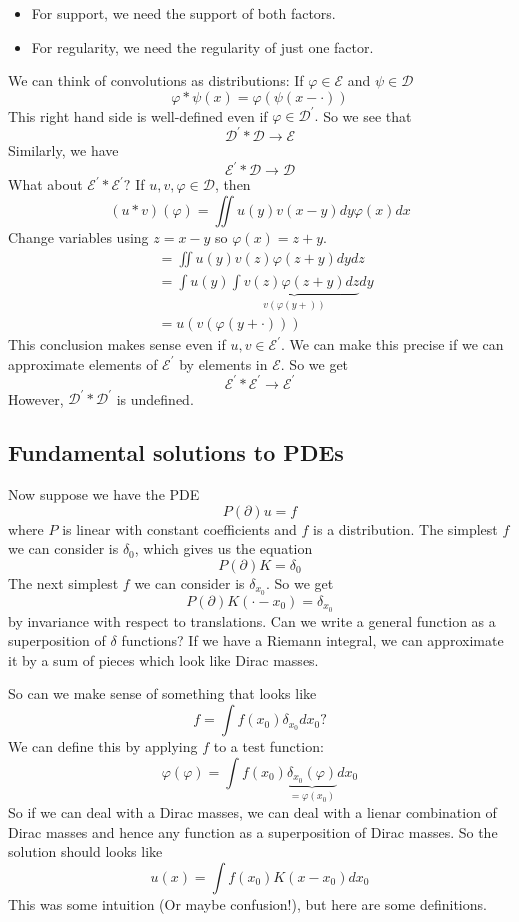 \begin{itemize}
    \item For support, we need the support of both factors.
    \item For regularity, we need the regularity of just one factor.
\end{itemize}
We can think of convolutions as distributions: If $\varphi \in \mathcal{E}$ and $\psi \in \mathcal{D}$
$$
\varphi * \psi(x)=\varphi(\psi(x-\cdot))
$$
This right hand side is well-defined even if $\varphi \in \mathcal{D}^{\prime} .$ So we see that
$$
\mathcal{D}^{\prime} * \mathcal{D} \rightarrow \mathcal{E}
$$
Similarly, we have
$$
\mathcal{E}^{\prime} * \mathcal{D} \rightarrow \mathcal{D}
$$
What about $\mathcal{E}^{\prime} * \mathcal{E}^{\prime} ?$ If $u, v, \varphi \in \mathcal{D}$, then
$$
(u * v)(\varphi)=\iint u(y) v(x-y) d y \varphi(x) d x
$$
Change variables using $z=x-y$ so $\varphi(x)=z+y$.
$$
\begin{aligned}
&=\iint u(y) v(z) \varphi(z+y) d y d z \\
&=\int u(y) \underbrace{\int v(z) \varphi(z+y) d z}_{v(\varphi(y+))} d y \\
&=u(v(\varphi(y+\cdot)))
\end{aligned}
$$
This conclusion makes sense even if $u, v \in \mathcal{E}^{\prime} .$ We can make this precise if we can approximate elements of $\mathcal{E}^{\prime}$ by elements in $\mathcal{E} .$ So we get
$$
\mathcal{E}^{\prime} * \mathcal{E}^{\prime} \rightarrow \mathcal{E}^{\prime}
$$
However, $\mathcal{D}^{\prime} * \mathcal{D}^{\prime}$ is undefined.

\subsection{Fundamental solutions to PDEs}
Now suppose we have the PDE
$$
P(\partial) u=f
$$
where $P$ is linear with constant coefficients and $f$ is a distribution. The simplest $f$ we can consider is $\delta_{0}$, which gives us the equation
$$
P(\partial) K=\delta_{0}
$$
The next simplest $f$ we can consider is $\delta_{x_{0}} .$ So we get
$$
P(\partial) K\left(\cdot-x_{0}\right)=\delta_{x_{0}}
$$
by invariance with respect to translations.
Can we write a general function as a superposition of $\delta$ functions? If we have a Riemann integral, we can approximate it by a sum of pieces which look like Dirac masses.

So can we make sense of something that looks like
$$
f=\int f\left(x_{0}\right) \delta_{x_{0}} d x_{0} ?
$$
We can define this by applying $f$ to a test function:
$$
\varphi(\varphi)=\int f\left(x_{0}\right) \underbrace{\delta_{x_{0}}(\varphi)}_{=\varphi\left(x_{0}\right)} d x_{0}
$$
So if we can deal with a Dirac masses, we can deal with a lienar combination of Dirac masses and hence any function as a superposition of Dirac masses. So the solution should looks like
$$
u(x)=\int f\left(x_{0}\right) K\left(x-x_{0}\right) d x_{0}
$$
This was some intuition (Or maybe confusion!), but here are some definitions.


